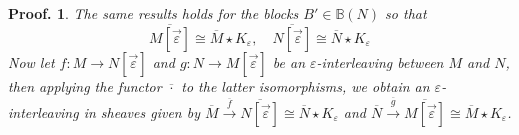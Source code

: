 \documentclass[a4paper, english, 11pt]{article}
\newcommand{\0}{\vec{0}}
\newtheorem*{pf}{Proof.} }
\begin{document}
\begin{pf}
 \smallskip
 
 The same results holds for  the blocks $B'\in 
 \mathbb{B}(N)$ so that 
 $$\overline{M [\vec{\varepsilon}]} \cong \overline{M}\star K_{\varepsilon}, \quad  \overline{N [\vec{\varepsilon}]} \cong \overline{N}\star K_{\varepsilon}$$
 Now let $f: M\to N[\vec{\varepsilon}]$ and $g: N\to M[\vec{\varepsilon}]$ be an $\varepsilon$-interleaving between $M$ and $N$, then applying the functor $\overline{\cdot}$ to the latter isomorphisms, we obtain  an $\varepsilon$-interleaving in sheaves given by  
 $ \overline{M}\stackrel{\overline{f}}\to \overline{N[\vec{\varepsilon}]}\cong \overline{N}\star K_\varepsilon$ 
 and $\overline{N}\stackrel{\overline{g}}\to \overline{M[\vec{\varepsilon}]}\cong \overline{M}\star K_{\varepsilon}$.
\end{pf}
\end{document}
